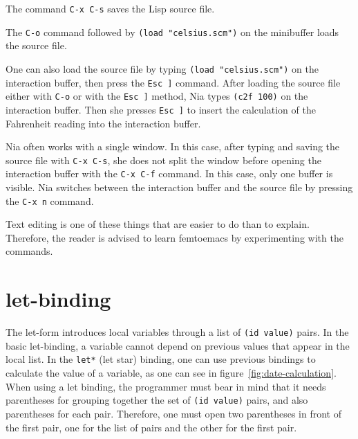 \documentclass[a4paper,12pt]{book}
\begin{document}
The command \verb|C-x C-s| saves the Lisp source 
file. 

The \verb|C-o| command followed
by \verb|(load "celsius.scm")| on the minibuffer
loads the  source file.

One can also load the source file
by typing \verb|(load "celsius.scm")|
on the interaction buffer, 
then press the \verb|Esc ]| command.
After loading the source file either
with \verb|C-o| or with the \verb|Esc ]| method,
Nia types \verb|(c2f 100)| on the interaction
buffer. Then she presses \verb|Esc ]| to
insert the calculation of the Fahrenheit reading
into the interaction buffer.

Nia often works with a single window. 
In this case, after typing and saving
the source file with \verb|C-x C-s|,
she does not split the window
before opening the interaction buffer with the
\verb|C-x C-f| command. In this case,
only one buffer is visible. Nia switches 
between the interaction buffer and
the source file by pressing the  \verb|C-x n|
command. 

Text editing is one of these things that
are easier to do than to explain. Therefore,
the reader is advised to learn femtoemacs
by experimenting with the commands.

\section{let-binding}
The let-form introduces local variables through
a list of \verb|(id value)| pairs.
In the basic let-binding, a variable cannot 
depend on previous values that appear
in the local list. In the 
\verb|let*| (let star) binding,
one can use previous bindings to calculate
the value of a variable, as one can see in
figure~\ref{fig:date-calculation}.
When using a let binding, the programmer must
bear in mind that it needs parentheses for
grouping together the set of \verb|(id value)| pairs,
and also parentheses for each pair. Therefore,
one must open two parentheses in front of the
first pair, one for the list of pairs and the
other for the first pair.
\end{document}
